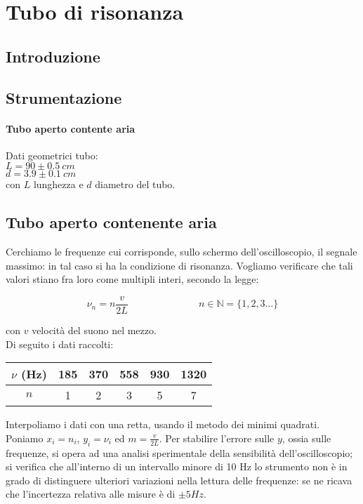 
\chapter{Tubo di risonanza}

\section{Introduzione}

\section{Strumentazione}
\subsubsection{Tubo aperto contente aria}
Dati geometrici tubo:\\
$L = 90\pm 0.5\ cm$\\
$d = 3.9\pm 0.1\ cm$\\
con $L$ lunghezza e $d$ diametro del tubo.

\section{Tubo aperto contenente aria}
Cerchiamo le frequenze cui corrisponde, sullo schermo dell'oscilloscopio, il segnale massimo: in tal caso si ha la condizione di risonanza. Vogliamo verificare che tali valori stiano fra loro come multipli interi, secondo la legge:

\begin{equation} \label{eq:gianni}
\nu_n= n\frac{v}{2L} \hspace{3cm} n\in\mathbb{N} = \lbrace 1,2,3 \dots \rbrace
\end{equation}

con $v$ velocità del suono nel mezzo.
\\
Di seguito i dati raccolti:
\begin{center}
\begin{tabular}{c|c|c|c|c|c}
$\nu$ (Hz) & 185 & 370 & 558 & 930 & 1320 \\
\midrule
$n$ & 1 & 2 & 3 & 5 & 7\\
\end{tabular}
\end{center}

Interpoliamo i dati con una retta, usando il metodo dei minimi quadrati. Poniamo $x_i=n_i$, $y_i=\nu_i$ ed $m=\displaystyle{\frac{v}{2L}}$. Per stabilire l'errore sulle $y$, ossia sulle frequenze, si opera ad una analisi sperimentale della sensibilità dell'oscilloscopio; si verifica che all'interno di un intervallo minore di 10 Hz lo strumento non è in grado di distinguere ulteriori variazioni nella lettura delle frequenze: se ne ricava che l'incertezza relativa alle misure è di $\pm5 Hz$.

